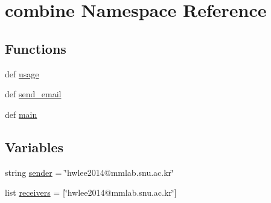 \hypertarget{namespacecombine}{\section{combine Namespace Reference}
\label{namespacecombine}
}
\subsection*{Functions}
\begin{DoxyCompactItemize}
\item 
def \hyperlink{namespacecombine_acc4f6a86eea086d43026129999679a90}{usage}
\item 
def \hyperlink{namespacecombine_a87b073c12837dcc883023977b2ca382e}{send\-\_\-email}
\item 
def \hyperlink{namespacecombine_aaab814fdd6b8e7f4f54fcfeb4a59f539}{main}
\end{DoxyCompactItemize}
\subsection*{Variables}
\begin{DoxyCompactItemize}
\item 
string \hyperlink{namespacecombine_acee645fca53ea3c850968cc609b6ab07}{sender} = \char`\"{}hwlee2014@mmlab.\-snu.\-ac.\-kr\char`\"{}
\item 
list \hyperlink{namespacecombine_a3109d4c35f74aa4701eac37ac1cddf88}{receivers} = \mbox{[}\char`\"{}hwlee2014@mmlab.\-snu.\-ac.\-kr\char`\"{}\mbox{]}
\end{DoxyCompactItemize}


